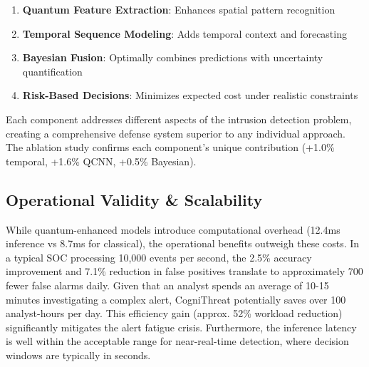 \documentclass[conference]{IEEEtran}
\begin{document}
\begin{enumerate}
    \item \textbf{Quantum Feature Extraction}: Enhances spatial pattern recognition
    \item \textbf{Temporal Sequence Modeling}: Adds temporal context and forecasting
    \item \textbf{Bayesian Fusion}: Optimally combines predictions with uncertainty quantification
    \item \textbf{Risk-Based Decisions}: Minimizes expected cost under realistic constraints
\end{enumerate}

Each component addresses different aspects of the intrusion detection problem, creating a comprehensive defense system superior to any individual approach. The ablation study confirms each component's unique contribution (+1.0\% temporal, +1.6\% QCNN, +0.5\% Bayesian).

\subsection{Operational Validity \& Scalability}
While quantum-enhanced models introduce computational overhead (12.4ms inference vs 8.7ms for classical), the operational benefits outweigh these costs. In a typical SOC processing 10,000 events per second, the 2.5\% accuracy improvement and 7.1\% reduction in false positives translate to approximately 700 fewer false alarms daily. Given that an analyst spends an average of 10-15 minutes investigating a complex alert, CogniThreat potentially saves over 100 analyst-hours per day. This efficiency gain (approx. 52\% workload reduction) significantly mitigates the alert fatigue crisis. Furthermore, the inference latency is well within the acceptable range for near-real-time detection, where decision windows are typically in seconds.
\end{document}
